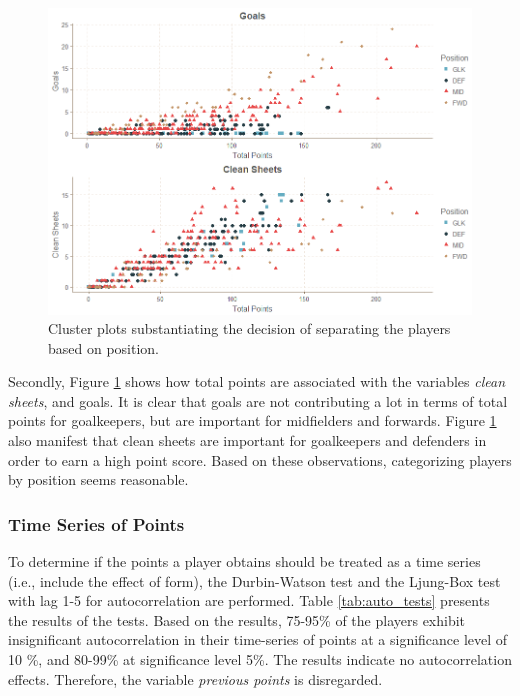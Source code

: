 \begin{figure}[ht]
    \centering
    \includegraphics[scale=0.4]{fig/chapter_6/goals_cs.png}
    \caption{Cluster plots substantiating the decision of separating the players based on position.}
\label{fig:cluster_plots}    
\end{figure}%

\FloatBarrier

Secondly, Figure \ref{fig:cluster_plots} shows how total points are associated with the variables \textit{clean sheets}, and goals. It is clear that goals are not contributing a lot in terms of total points for goalkeepers, but are important for midfielders and forwards. Figure \ref{fig:cluster_plots} also manifest that clean sheets are important for goalkeepers and defenders in order to earn a high point score. Based on these observations, categorizing players by position seems reasonable.


\subsubsection{Time Series of Points}

To determine if the points a player obtains should be treated as a time series (i.e., include the effect of form), the Durbin-Watson test and the Ljung-Box test with lag 1-5 for autocorrelation are performed. Table \ref{tab:auto_tests} presents the results of the tests. Based on the results, 75-95\% of the players exhibit insignificant autocorrelation in their time-series of points at a significance level of 10 \%, and 80-99\% at significance level 5\%. The results indicate no autocorrelation effects. Therefore, the variable \textit{previous points} is disregarded.

